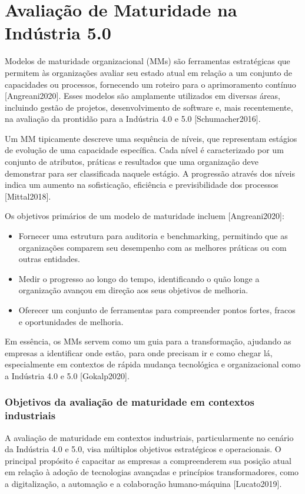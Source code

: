 \chapter{Avaliação de Maturidade na Indústria 5.0}


Modelos de maturidade organizacional (MMs) são ferramentas estratégicas que permitem às organizações avaliar seu estado atual em relação a um conjunto de capacidades ou processos, fornecendo um roteiro para o aprimoramento contínuo [Angreani2020]. Esses modelos são amplamente utilizados em diversas áreas, incluindo gestão de projetos, desenvolvimento de software e, mais recentemente, na avaliação da prontidão para a Indústria 4.0 e 5.0 [Schumacher2016].

Um MM tipicamente descreve uma sequência de níveis, que representam estágios de evolução de uma capacidade específica. Cada nível é caracterizado por um conjunto de atributos, práticas e resultados que uma organização deve demonstrar para ser classificada naquele estágio. A progressão através dos níveis indica um aumento na sofisticação, eficiência e previsibilidade dos processos [Mittal2018].

Os objetivos primários de um modelo de maturidade incluem [Angreani2020]:
\begin{itemize}
    \item Fornecer uma estrutura para auditoria e benchmarking, permitindo que as organizações comparem seu desempenho com as melhores práticas ou com outras entidades.
    \item Medir o progresso ao longo do tempo, identificando o quão longe a organização avançou em direção aos seus objetivos de melhoria.
    \item Oferecer um conjunto de ferramentas para compreender pontos fortes, fracos e oportunidades de melhoria.
\end{itemize}

Em essência, os MMs servem como um guia para a transformação, ajudando as empresas a identificar onde estão, para onde precisam ir e como chegar lá, especialmente em contextos de rápida mudança tecnológica e organizacional como a Indústria 4.0 e 5.0 [Gokalp2020].

\subsection{Objetivos da avaliação de maturidade em contextos industriais}

A avaliação de maturidade em contextos industriais, particularmente no cenário da Indústria 4.0 e 5.0, visa múltiplos objetivos estratégicos e operacionais. O principal propósito é capacitar as empresas a compreenderem sua posição atual em relação à adoção de tecnologias avançadas e princípios transformadores, como a digitalização, a automação e a colaboração humano-máquina [Lucato2019].

